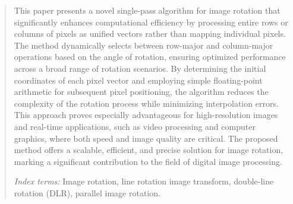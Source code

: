 \documentclass[conference]{IEEEtran}
\begin{document}
\begin{abstract}
    This paper presents a novel single-pass algorithm for image rotation that significantly enhances computational efficiency by processing entire rows or columns of pixels as unified vectors rather than mapping individual pixels. The method dynamically selects between row-major and column-major operations based on the angle of rotation, ensuring optimized performance across a broad range of rotation scenarios. By determining the initial coordinates of each pixel vector and employing simple floating-point arithmetic for subsequent pixel positioning, the algorithm reduces the complexity of the rotation process while minimizing interpolation errors. This approach proves especially advantageous for high-resolution images and real-time applications, such as video processing and computer graphics, where both speed and image quality are critical. The proposed method offers a scalable, efficient, and precise solution for image rotation, marking a significant contribution to the field of digital image processing.

    \textit{Index terms:} Image rotation, line rotation image transform, double-line rotation (DLR), parallel image rotation.
\end{abstract}
\IEEEpeerreviewmaketitle
\end{document}
